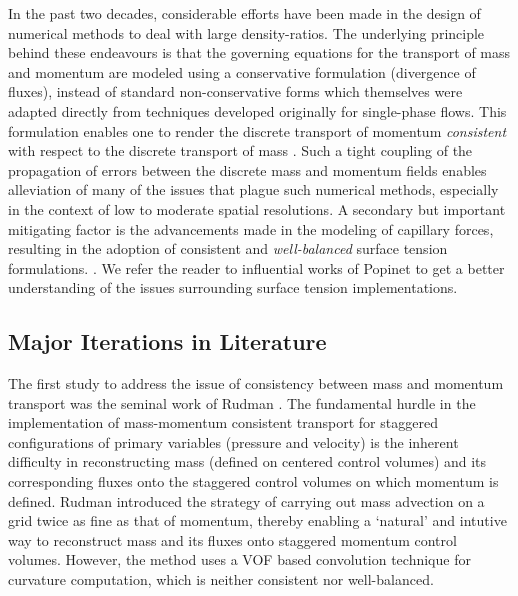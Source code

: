 In the past two decades, considerable efforts have been made 
in the design of numerical methods to deal with large density-ratios. 
The underlying principle behind these endeavours is that the governing 
equations for the transport of mass and momentum are modeled using a 
conservative formulation (divergence of fluxes), instead of standard 
non-conservative forms which themselves were adapted directly from 
techniques developed originally for single-phase flows. 
This formulation enables one to render the discrete transport of 
momentum \textit{consistent} with respect to the discrete transport of mass  
. 
Such a tight coupling of the propagation of errors between the discrete 
mass and momentum fields enables alleviation of many of the issues 
that plague such numerical methods, especially in the 
context of low to moderate spatial resolutions. 
A secondary but important mitigating factor is the advancements 
made in the modeling of capillary forces, resulting in the adoption of 
consistent and \textit{well-balanced} surface tension formulations.
.
We refer the reader to influential works of Popinet \cite{popinet2018numerical,popinet2009accurate}
to get a better understanding of the issues surrounding surface tension implementations.  

\subsection*{Major Iterations in Literature}


The first study to address the issue of consistency between mass 
and momentum transport was the seminal work of Rudman .
The fundamental hurdle in the implementation of mass-momentum 
consistent transport for staggered configurations of primary variables 
(pressure and velocity) is the inherent difficulty in reconstructing mass 
(defined on centered control volumes) and its corresponding fluxes 
onto the staggered control volumes on which momentum is defined. 
Rudman introduced the strategy of carrying out mass advection 
on a grid twice as fine as that of momentum, 
thereby enabling a `natural' and intutive 
way to reconstruct mass and its fluxes onto staggered momentum control volumes. 
However, the method uses a VOF based convolution technique for curvature computation, 
which is neither consistent nor well-balanced.    


